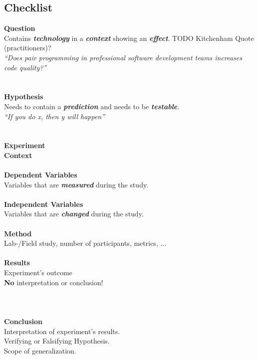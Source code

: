 \newcommand{\exampleQuote}[1]{\small{\textit{``#1''}}}

\subsection{Checklist}

{\large\textbf{Question}}\\
Contains \textbf{\textit{technology}} in a \textbf{\textit{context}} showing an \textbf{\textit{effect}}. TODO Kitchenham Quote (practitioners)?\\
\exampleQuote{Does pair programming in professional software development teams increases code quality?}
\\
\\
\\
{\large\textbf{Hypothesis}}\\
Needs to contain a \textbf{\textit{prediction}} and needs to be \textbf{\textit{testable}}.\\
\exampleQuote{If you do x, then y will happen}
\\
\\
\\
{\large\textbf{Experiment}}\\
\textbf{Context}\\
\\
\textbf{Dependent Variables}\\
Variables that are  \textbf{\textit{measured}} during the study.\\
\\
\textbf{Independent Variables}\\
Variables that are  \textbf{\textit{changed}} during the study.\\
\\
\textbf{Method}\\
Lab-/Field study, number of participants, metrics, ...\\
\\
\textbf{Results}\\
Experiment's outcome\\
\textbf{No} interpretation or conclusion!\\
\\
\\
\\
{\large\textbf{Conclusion}}\\
Interpretation of experiment's results.\\
Verifying or Falsifying Hypothesis.\\
Scope of generalization.

